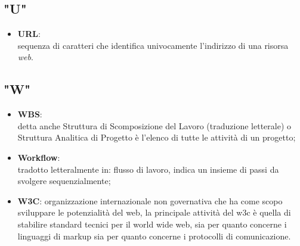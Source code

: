 \subsection{"U"}
\begin{itemize}
\item \textbf{URL}:\\ sequenza di caratteri che identifica univocamente l'indirizzo di una risorsa \textit{web}.
\end{itemize}

\subsection{"W"}
\begin{itemize}
\item \textbf{WBS}:\\ detta anche Struttura di Scomposizione del Lavoro (traduzione letterale) o Struttura Analitica di Progetto è l'elenco di tutte le attività di un progetto;
\item \textbf{Workflow}:\\ tradotto letteralmente in: flusso di lavoro, indica un insieme di passi da svolgere sequenzialmente;
\item \textbf{W3C}: organizzazione internazionale non governativa che ha come scopo sviluppare le potenzialità del web, la principale attività del w3c è quella di stabilire standard tecnici per il world wide web, sia per quanto concerne i linguaggi di markup sia per quanto concerne i protocolli di comunicazione.
\end{itemize}

